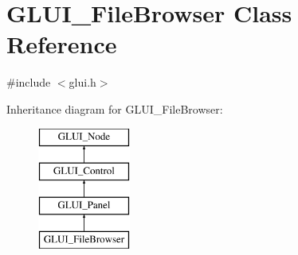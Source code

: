 \hypertarget{classGLUI__FileBrowser}{\section{G\-L\-U\-I\-\_\-\-File\-Browser Class Reference}
\label{classGLUI__FileBrowser}
}


{\ttfamily \#include $<$glui.\-h$>$}

Inheritance diagram for G\-L\-U\-I\-\_\-\-File\-Browser\-:\begin{figure}[H]
\begin{center}
\leavevmode
\includegraphics[height=4.000000cm]{classGLUI__FileBrowser}
\end{center}
\end{figure}
